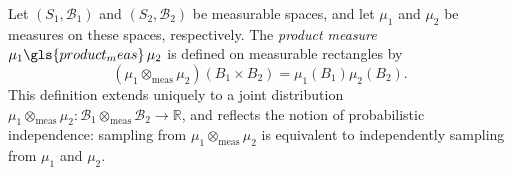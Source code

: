 \begin{definition} 
   Let $(S_1, \mathcal{B}_1)$ and $(S_2, \mathcal{B}_2)$ be measurable spaces, and let $\mu_1$ and $\mu_2$ be measures on these spaces, respectively. The \emph{product measure} $\mu_1 \gls{product_meas} \, \mu_2$ is  defined on measurable rectangles by
$$
(\mu_1 \otimes_{\text{meas}} \mu_2)(B_1 \times B_2) = \mu_1(B_1)\mu_2(B_2).
$$
This definition extends uniquely to a joint distribution $\mu_1 \otimes_{\text{meas}} \mu_2: \mathcal{B}_1 \otimes_{\text{meas}} \mathcal{B}_2 \to \mathbb{R}$, and reflects the notion of probabilistic independence: sampling from $\mu_1 \otimes_{\text{meas}} \mu_2$ is equivalent to independently sampling from $\mu_1$ and $\mu_2$.
\end{definition}

\begin{comment}
\begin{definition}
Let $(S, \mathcal{B}_S)$ and $(T, \mathcal{B}_T)$ be measurable spaces. A \emph{Markov kernel} is a mapping $P : S \times \mathcal{B}_T \to [0,1]$
satisfying the following two properties:
\begin{enumerate}
    \item For each fixed $s \in S$, the function $P(s, \cdot) : \mathcal{B}_T \to [0,1]$ is a probability measure on $(T, \mathcal{B}_T)$.
    \item For each fixed $A \in \mathcal{B}_T$, the function $P(\cdot, A) : S \to [0,1]$ is a measurable function on $(S, \mathcal{B}_S)$.
\end{enumerate}
\end{definition}



By a slight abuse of terminology, we will also refer to a mapping $ P' : S \to (\mathcal{B}_T \to [0,1]), \, P'(s)=\mu $, as a Markov kernel, when there exists a Markov kernel $ P : S \times \mathcal{B}_T \to [0,1], \, P(s,A)=\mu (A) $  for all $s \in S $ and $A \in \mathcal{B}_T$.

\begin{definition}
  Given a measure $\mu$ on $S$ and a Markov kernel $P: S \times \mathcal{B}_T \to [0,1]$, we can define the \emph{pushforward} of $\mu$   under the Markov kernel $P$  as:
$$
P_*(\mu)(B) = \int_S P(s, B) \, \mu(ds), \quad \forall B \in \mathcal{B}_T.
$$
\end{definition}

Any measurable function \( f : (S, \mathcal{B}_S) \to (T, \mathcal{B}_T) \) induces a simple Markov kernel $ s \mapsto \delta_{f(s)} $. As a result,  the usual definition of the pushforward measure (Definition \ref{def:pushforward_meas_1}) becomes a special case of the general formulation defined above.

\end{comment}

